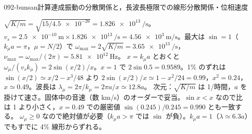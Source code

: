 \documentclass[uplatex,dvipdfmx,a4paper,11pt]{jsarticle}
\begin{document}
\begin{mondai}{092-bunsan}{計算}{連成振動の分散関係と，長波長極限での線形分散関係・位相速度}
\begin{tadashii}
 $\sqrt{K/m}=\sqrt{15/\num{4.5e-26}}=\qty{1.826e13}{\per\second}$。$v_s=\qty{2.5e-10}{\metre}\times\qty{1.826e13}{\per\second}=\qty{4.56e3}{\metre\per\second}$。最大は $\sin=1$（$k_\mu a=\pi$，$\mu=N/2$）で $\omega_{\max}=2\sqrt{K/m}=\qty{3.65e13}{\per\second}$，$\nu_{\max}=\omega_{\max}/(2\pi)=\qty{5.81e12}{\hertz}$。
 $x=k_\mu a$ とおくと $\omega_\mu/(v_sk_\mu)=2\sin(x/2)/x$。$x=1$ で $2\sin0.5=0.9589$。1\% のずれは $\sin(x/2)\simeq x/2-x^{3}/48$ より $2\sin(x/2)/x\simeq1-x^{2}/24=0.99$，$x^{2}=0.24$，$x\simeq0.49$。波長は $\lambda_\mu=2\pi/k_\mu=2\pi a/x\simeq12.8a$。
\kenzan 次元：$\sqrt{K/m}$ は 1/時間，$a$ を掛けて速さ。固体中の音速（数 km/s）のオーダーで妥当。$\sin x<x$ なので比は 1 より小さく，$x=0.49$ での厳密値 $\sin(0.245)/0.245=0.990$ とも一致する。
\tsumazuki $\omega_\mu\ge0$ なので絶対値が必要（$k_\mu a>\pi$ では $\sin$ が負）。$k_\mu a=1$（$\lambda\simeq6.3a$）でもすでに 4\% 線形からずれる。
\end{tadashii}
\end{mondai}
\end{document}
